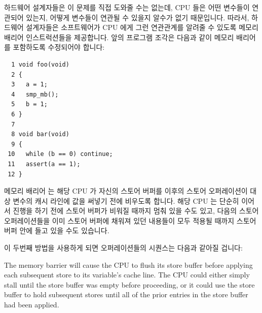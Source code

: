 하드웨어 설계자들은 이 문제를 직접 도와줄 수는 없는데, CPU 들은 어떤 변수들이
연관되어 있는지, 어떻게 변수들이 연관될 수 있을지 알수가 없기 때문입니다.
따라서, 하드웨어 설계자들은 소프트웨어가 CPU 에게 그런 연관관계를 알려줄 수
있도록 메모리 배리어 인스트럭션들을 제공합니다.
앞의 프로그램 조각은 다음과 같이 메모리 배리어를 포함하도록 수정되어야 합니다:

\vspace{5pt}
\begin{minipage}[t]{\columnwidth}
\small
\begin{verbatim}
  1 void foo(void)
  2 {
  3   a = 1;
  4   smp_mb();
  5   b = 1;
  6 }
  7
  8 void bar(void)
  9 {
 10   while (b == 0) continue;
 11   assert(a == 1);
 12 }
\end{verbatim}
\end{minipage}
\vspace{5pt}

메모리 배리어  는 해당 CPU 가 자신의 스토어 버퍼를 이후의 스토어
오퍼레이션이 대상 변수의 캐시 라인에 값을 써넣기 전에 비우도록 합니다.
해당 CPU 는 단순히 이어서 진행을 하기 전에 스토어 버퍼가 비워질 때까지 멈춰
있을 수도 있고, 다음의 스토어 오퍼레이션들을 이미 스토어 버퍼에 채워져 있던
내용들이 모두 적용될 때까지 스토어 버퍼 안에 들고 있을 수도 있습니다.

이 두번째 방법을 사용하게 되면 오퍼레이션들의 시퀀스는 다음과 같아질 겁니다:
\iffalse

The memory barrier  will cause the CPU to flush its store
buffer before applying each subsequent store to its variable's cache line.
The CPU could either simply stall until the store buffer was empty
before proceeding, or it could use the store buffer to hold subsequent
stores until all of the prior entries in the store buffer had been
applied.

